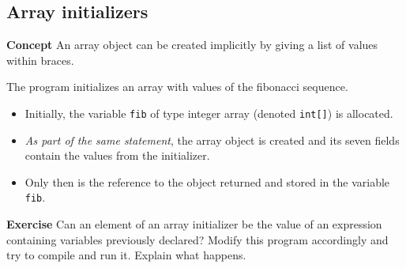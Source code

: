 \subsection{Array initializers}\label{array.02}

\textbf{Concept} An array object can be created implicitly by giving a list of values 
within braces.


The program initializes an array with values of the fibonacci sequence.
\begin{itemize}
\item Initially, the variable \texttt{fib} of type integer array (denoted \texttt{int[]}) is allocated. 
\item \emph{As part of the same statement}, the array object is created and 
its seven fields contain the values from the initializer.
\item Only then is the reference to the object returned and stored in the variable \texttt{fib}.
\end{itemize}

\textbf{Exercise} Can an element of an array initializer be the value of
an expression containing variables previously declared? Modify this program
accordingly and try to compile and run it. Explain what happens.
 